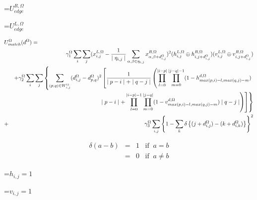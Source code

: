 {\newpage
\clearpage
\samepage \setbox\sizebox=\hbox{$U^{R,\Omega}_{edge}$}\box\sizebox
}

{\newpage
\clearpage
\samepage \setbox\sizebox=\hbox{$U^{L,\Omega}_{edge}$}\box\sizebox
}

{\newpage
\clearpage
\samepage \begin{eqnarray}%
\lefteqn{U^{\Omega}_{match}(d^{\Omega}) =} \nonumber \\ 
& & \gamma_1^{\Omega} \sum_{i} \sum_{j} (x_{i,j}^{L, \Omega} -
\frac{1}{\mid \eta_{i,j}\mid }\sum_{\alpha,\beta \in \eta_{i,j}} x_{\alpha,\beta+d^{\Omega}_{i,j}}^{R, \Omega} )^2 (h_{i,j}^{L, \Omega} \oplus h^{R, \Omega}_{i,j+d_{i,j}^{\Omega}})
( v_{i,j}^{L, \Omega} \oplus v^{R, \Omega}_{i,j+d_{i,j}^{\Omega}} ) \nonumber \\ 
& & + \gamma_2^{\Omega} \sum_{i} \sum_{j} \left \{ \sum_{(p , q) \in W^{\Omega}_{i,j}} ( d^{\Omega}_{i,j} - d^{\Omega}_{ p , q })^2 
\left [ \frac{1}{\mid p - i \mid + \mid q - j \mid } \left  (
\prod_{l=0}^{\mid i - p \mid} \prod_{m=0}^{ \mid j - q \mid -1 }
( 1 - h^{d, \Omega}_{max( p , i)-l , max( q , j) - m } ) 
\right . \right . \right . \nonumber \\ 
& & \left . \left . \left .  \mid p - i \mid + \prod_{l=0}^{\mid i - p \mid -1 } \prod_{m=0}^{ \mid j -  q\mid}
( 1 - v^{d, \Omega}_{max( p , i)-l , max( q , j) - m } ) \mid q  - j \mid
\right ) \right ] \right \} \nonumber \\ 
&+& \gamma_3^{\Omega} \sum_{i,j} \left \{ 1- \sum_k \delta \left \{ (j+d^{\Omega}_{i,j})-(k+d^{\Omega}_{i,k}) \right \} \right \}^2
\label{eq:match}
\end{eqnarray}
}

{\newpage
\clearpage
\samepage \begin{eqnarray}\delta(a-b)&=& 1 \;\;\; \mbox{if}\;\; a  = b  \nonumber \\ 
           &=& 0 \;\;\; \mbox{if}\;\; a \neq b
\end{eqnarray}
}

{\newpage
\clearpage
\samepage \setbox\sizebox=\hbox{$h_{i,j}=1 $}\box\sizebox
}

{\newpage
\clearpage
\samepage \setbox\sizebox=\hbox{$v_{i,j}=1 $}\box\sizebox
}

